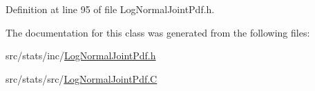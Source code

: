 Definition at line 95 of file Log\-Normal\-Joint\-Pdf.\-h.



The documentation for this class was generated from the following files\-:\begin{DoxyCompactItemize}
\item 
src/stats/inc/\hyperlink{_log_normal_joint_pdf_8h}{Log\-Normal\-Joint\-Pdf.\-h}\item 
src/stats/src/\hyperlink{_log_normal_joint_pdf_8_c}{Log\-Normal\-Joint\-Pdf.\-C}\end{DoxyCompactItemize}
